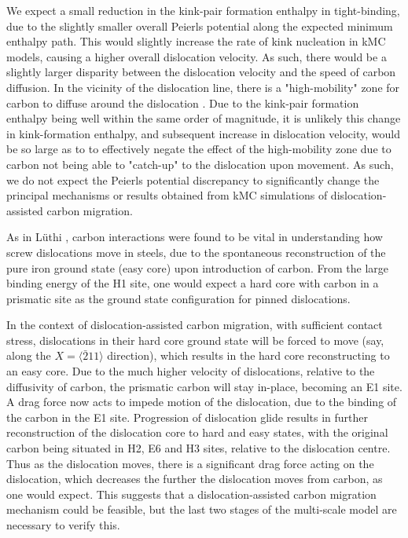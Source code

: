 \documentclass[a4paper,11pt]{article}
\begin{document}
We expect a small reduction in the kink-pair formation enthalpy in tight-binding, due to the
slightly smaller overall Peierls potential along the expected minimum enthalpy path. This
would slightly increase the rate of kink nucleation in kMC models, causing a higher overall
dislocation velocity. As such, there would be a slightly larger disparity between the
dislocation velocity and the speed of carbon diffusion. In the vicinity of the dislocation
line, there is a "high-mobility" zone for carbon to diffuse around the dislocation
\cite{Nematollahi2016}. Due to the kink-pair formation enthalpy being well within the same
order of magnitude, it is unlikely this change in kink-formation enthalpy, and subsequent
increase in dislocation velocity, would be so large as to to effectively negate the effect
of the high-mobility zone due to carbon not being able to "catch-up" to the dislocation upon
movement. As such, we do not expect the Peierls potential discrepancy to significantly
change the principal mechanisms or results obtained from kMC simulations of
dislocation-assisted carbon migration.



As in Lüthi \cite{Lthi2019}, carbon interactions were found to be vital in understanding how screw
dislocations move in steels, due to the spontaneous reconstruction of the pure iron ground state
(easy core) upon introduction of carbon. From the large binding energy of the H1 site, one would
expect a hard core with carbon in a prismatic site as the ground state configuration for pinned
dislocations.

In the context of dislocation-assisted carbon migration, with sufficient contact stress,
dislocations in their hard core ground state will be forced to move (say, along the \(X =
    \langle\bar{2}11\rangle\) direction), which results in the hard core reconstructing to an easy core. Due to
the much higher velocity of dislocations, relative to the diffusivity of carbon, the
prismatic carbon will stay in-place, becoming an E1 site. A drag force now acts to impede motion of the
dislocation, due to the binding of the carbon in the E1 site. Progression of dislocation glide
results in further reconstruction of the dislocation core to hard and easy states, with the
original carbon being situated in H2, E6 and H3 sites, relative to the dislocation
centre. Thus as the dislocation moves, there is a significant drag force acting on the
dislocation, which decreases the further the dislocation moves from carbon, as one would
expect. This suggests that a dislocation-assisted carbon migration mechanism could be feasible,
but the last two stages of the multi-scale model are necessary to verify this.
\end{document}
